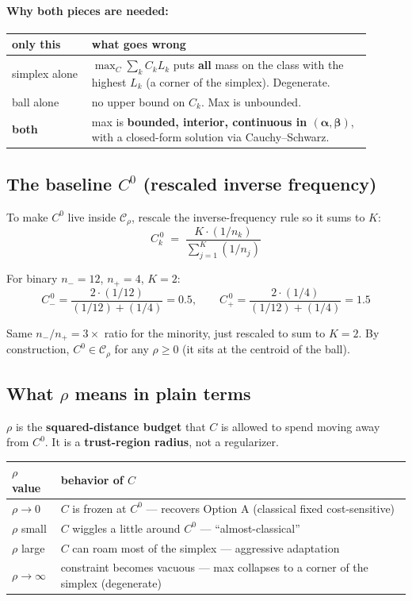 \documentclass[11pt,a4paper]{article}
\begin{document}
\paragraph{Why both pieces are needed:}

\begin{center}
\begin{tabular}{p{0.20\linewidth}p{0.70\linewidth}}
\toprule
\textbf{only this} & \textbf{what goes wrong} \\
\midrule
simplex alone & $\max_C \sum_k C_k L_k$ puts \textbf{all} mass on the class with the highest $L_k$ (a corner of the simplex). Degenerate. \\
ball alone & no upper bound on $C_k$. Max is unbounded. \\
\textbf{both} & max is \textbf{bounded, interior, continuous in $(\boldsymbol{\alpha}, \boldsymbol{\beta})$}, with a closed-form solution via Cauchy--Schwarz. \\
\bottomrule
\end{tabular}
\end{center}

\subsection{The baseline $C^0$ (rescaled inverse frequency)}

To make $C^0$ live inside $\mathcal{C}_\rho$, rescale the inverse-frequency rule so it sums to $K$:
\[
C_k^{\,0} \;=\; \frac{K \cdot (1/n_k)}{\displaystyle\sum_{j=1}^{K}(1/n_j)}
\]

For binary $n_- = 12$, $n_+ = 4$, $K = 2$:
\[
C_-^{\,0} = \frac{2\cdot(1/12)}{(1/12)+(1/4)} = 0.5,\qquad C_+^{\,0} = \frac{2\cdot(1/4)}{(1/12)+(1/4)} = 1.5
\]

Same $n_-/n_+ = 3\times$ ratio for the minority, just rescaled to sum to $K = 2$. By construction, $C^0 \in \mathcal{C}_\rho$ for any $\rho \geq 0$ (it sits at the centroid of the ball).

\subsection{What $\rho$ means in plain terms}

$\rho$ is the \textbf{squared-distance budget} that $C$ is allowed to spend moving away from $C^0$. It is a \textbf{trust-region radius}, not a regularizer.

\begin{center}
\begin{tabular}{ll}
\toprule
\textbf{$\rho$ value} & \textbf{behavior of $C$} \\
\midrule
$\rho \to 0$ & $C$ is frozen at $C^0$ --- recovers Option A (classical fixed cost-sensitive) \\
$\rho$ small & $C$ wiggles a little around $C^0$ --- ``almost-classical'' \\
$\rho$ large & $C$ can roam most of the simplex --- aggressive adaptation \\
$\rho \to \infty$ & constraint becomes vacuous --- max collapses to a corner of the simplex (degenerate) \\
\bottomrule
\end{tabular}
\end{center}
\end{document}
